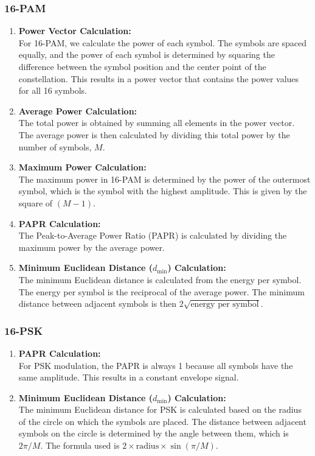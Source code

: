 \documentclass[11pt,a4paper,onecolumn,final]{article}
\begin{document}
\subsubsection*{16-PAM}
\begin{enumerate}
    \item \textbf{Power Vector Calculation:}\\
    For 16-PAM, we calculate the power of each symbol. The symbols are spaced equally, and the power of each symbol is determined by squaring the difference between the symbol position and the center point of the constellation. This results in a power vector that contains the power values for all 16 symbols.
    \item \textbf{Average Power Calculation:}\\
    The total power is obtained by summing all elements in the power vector. The average power is then calculated by dividing this total power by the number of symbols, \(M\).
    \item \textbf{Maximum Power Calculation:}\\
    The maximum power in 16-PAM is determined by the power of the outermost symbol, which is the symbol with the highest amplitude. This is given by the square of \((M - 1)\).
    \item \textbf{PAPR Calculation:}\\
    The Peak-to-Average Power Ratio (PAPR) is calculated by dividing the maximum power by the average power.
    \item \textbf{Minimum Euclidean Distance (\(d_{\text{min}}\)) Calculation:}\\
    The minimum Euclidean distance is calculated from the energy per symbol. The energy per symbol is the reciprocal of the average power. The minimum distance between adjacent symbols is then \(2 \sqrt{\text{energy per symbol}}\).
\end{enumerate}

\subsubsection*{16-PSK}
\begin{enumerate}
    \item \textbf{PAPR Calculation:}\\
    For PSK modulation, the PAPR is always 1 because all symbols have the same amplitude. This results in a constant envelope signal.
    \item \textbf{Minimum Euclidean Distance (\(d_{\text{min}}\)) Calculation:}\\
    The minimum Euclidean distance for PSK is calculated based on the radius of the circle on which the symbols are placed. The distance between adjacent symbols on the circle is determined by the angle between them, which is \(2 \pi / M\). The formula used is \(2 \times \text{radius} \times \sin(\pi / M)\).
\end{enumerate}
\end{document}
